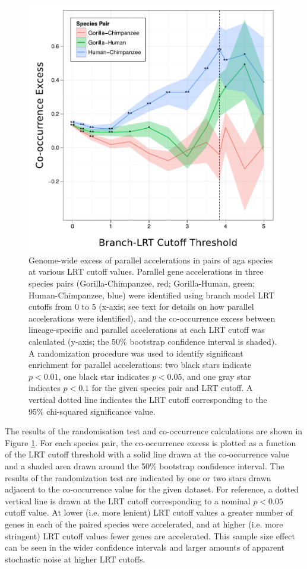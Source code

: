 \begin{figure}
\centering
\includegraphics[scale=0.7]{Figs/gorilla_parallel.pdf}
\caption{Genome-wide excess of parallel accelerations in pairs of
  \ac{aga} species at various LRT cutoff values. Parallel gene
  accelerations in three species pairs (Gorilla-Chimpanzee, red;
  Gorilla-Human, green; Human-Chimpanzee, blue) were identified using
  branch model LRT cutoffs from 0 to 5 (x-axis; see text for details
  on how parallel accelerations were identified), and the
  co-occurrence excess between lineage-specific and parallel
  accelerations at each LRT cutoff was calculated (y-axis; the 50\%
  bootstrap confidence interval is shaded). A randomization procedure
  was used to identify significant enrichment for parallel
  accelerations: two black stars indicate $p<0.01$, one black star
  indicates $p<0.05$, and one gray star indicates $p<0.1$ for the
  given species pair and LRT cutoff. A vertical dotted line indicates
  the LRT cutoff corresponding to the 95\% chi-squared significance
  value.}
\label{fig_gorilla_parallel}
\end{figure}

The results of the randomisation test and co-occurrence calculations
are shown in Figure \ref{fig_gorilla_parallel}. For each species pair,
the co-occurrence excess is plotted as a function of the LRT cutoff
threshold with a solid line drawn at the co-occurrence value and a
shaded area drawn around the 50\% bootstrap confidence interval. The
results of the randomization test are indicated by one or two stars
drawn adjacent to the co-occurrence value for the given dataset. For
reference, a dotted vertical line is drawn at the LRT cutoff
corresponding to a nominal $p<0.05$ \chisq cutoff value. At lower
(i.e. more lenient) LRT cutoff values a greater number of genes in
each of the paired species were accelerated, and at higher (i.e. more
stringent) LRT cutoff values fewer genes are accelerated. This sample
size effect can be seen in the wider confidence intervals and larger
amounts of apparent stochastic noise at higher LRT cutoffs.

